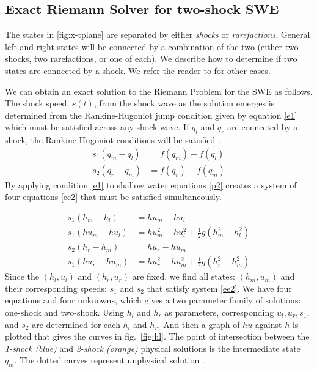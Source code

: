 \documentclass[11pt,a4paper]{article}
\begin{document}
	
	\subsection{Exact Riemann Solver for two-shock SWE}
	The states in \ref{fig:x-tplane} are separated by either {\em shocks} or {\em rarefactions}. General left and right states will be connected by a combination of the two (either two shocks, two rarefactions, or one of each).  We describe how to determine if two states are connected by a shock.  We refer the reader to  \cite{leveque2002finite} for other cases. 
	
	We can obtain an exact solution to the Riemann Problem for the SWE as follows. 
	The shock speed, $s(t)$,  from the shock wave as the solution emerges is determined from the Rankine-Hugoniot jump condition given by equation \eqref{e1}  which must be satisfied across any shock wave.  If $q_l$ and $q_r$ are connected by a shock, the Rankine Hugoniot conditions will be satisfied \cite{ma-ah-be-ca-ge-ha-ke-le-le:2016}. 
	\begin{equation}
		\begin{aligned}
			s_1(q_{m} - q_{l}) & = f(q_{m}) - f(q_{l}) \\
			s_2(q_{r} - q_{m}) & = f(q_{r}) - f(q_{m})
		\end{aligned}
		\label{e1}
	\end{equation}
	By applying condition  \eqref{e1} to shallow water equations \eqref{p2}  creates a system of four equations \eqref{ee2} that must be satisfied simultaneously. 
	
	\begin{equation}
		\begin{aligned}
			s_1(h_{m} - h_{l}) & = hu_{m} - hu_{l} \\
			s_1(hu_{m} - hu_{l})  &= hu_{m}^{2} - hu_{l}^{2} + \frac{1}{2}g(h_{m}^{2} - h_{l}^2)\\
			s_2(h_{r} - h_{m})  &=  hu_{r} - hu_{m}\\
			s_1(hu_{r} - hu_{m})  &= hu_{r}^{2} - hu_{m}^{2} + \frac{1}{2}g(h_{r}^{2} - h_{m}^2)
		\end{aligned}
		\label{ee2}
	\end{equation}
	Since the $(h_l,u_l)$ and $(h_r,u_r)$ are fixed, we find all states: $(h_m,u_m)$  and their corresponding speeds: $s_1$ and $s_2$ that satisfy system  \eqref{ee2}. We have four equations and four unknowns, which gives a two parameter family of solutions: one-shock and two-shock. Using $h_l$ and $h_r$ as parameters, corresponding $u_l,u_r,s_1, $and $s_2$ are determined for each $h_l$ and $h_r$. And then a graph of $hu$ against $h$ is plotted that gives the curves in fig.~\ref{fig:hl}. The point of intersection between the {\em 1-shock (blue)} and  {\em2-shock (orange)} physical solutions is the intermediate state $q_m$. The dotted curves represent unphysical solution \cite{leveque2002finite}.
	
\end{document}
